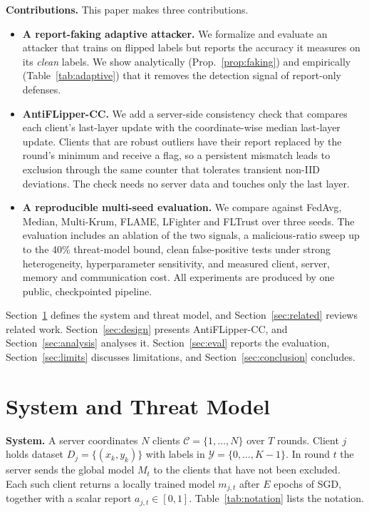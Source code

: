 \documentclass[conference]{IEEEtran}
\begin{document}
\textbf{Contributions.} This paper makes three contributions.
\begin{itemize}
\item \textbf{A report-faking adaptive attacker.} We formalize and evaluate an attacker that trains on flipped labels but reports the accuracy it measures on its \emph{clean} labels. We show analytically (Prop.~\ref{prop:faking}) and empirically (Table~\ref{tab:adaptive}) that it removes the detection signal of report-only defenses.
\item \textbf{AntiFLipper-CC.} We add a server-side consistency check that compares each client's last-layer update with the coordinate-wise median last-layer update. Clients that are robust outliers have their report replaced by the round's minimum and receive a flag, so a persistent mismatch leads to exclusion through the same counter that tolerates transient non-IID deviations. The check needs no server data and touches only the last layer.
\item \textbf{A reproducible multi-seed evaluation.} We compare against FedAvg, Median, Multi-Krum, FLAME, LFighter and FLTrust over three seeds. The evaluation includes an ablation of the two signals, a malicious-ratio sweep up to the 40\% threat-model bound, clean false-positive tests under strong heterogeneity, hyperparameter sensitivity, and measured client, server, memory and communication cost. All experiments are produced by one public, checkpointed pipeline.
\end{itemize}

Section~\ref{sec:model} defines the system and threat model, and Section~\ref{sec:related} reviews related work. Section~\ref{sec:design} presents AntiFLipper-CC, and Section~\ref{sec:analysis} analyses it. Section~\ref{sec:eval} reports the evaluation, Section~\ref{sec:limits} discusses limitations, and Section~\ref{sec:conclusion} concludes.

\section{System and Threat Model}
\label{sec:model}
\textbf{System.} A server coordinates $N$ clients $\mathcal{C}=\{1,\dots,N\}$ over $T$ rounds. Client $j$ holds dataset $D_j=\{(x_k,y_k)\}$ with labels in $\mathcal{Y}=\{0,\dots,K-1\}$. In round $t$ the server sends the global model $M_t$ to the clients that have not been excluded. Each such client returns a locally trained model $m_{j,t}$ after $E$ epochs of SGD, together with a scalar report $a_{j,t}\in[0,1]$. Table~\ref{tab:notation} lists the notation.
\end{document}
